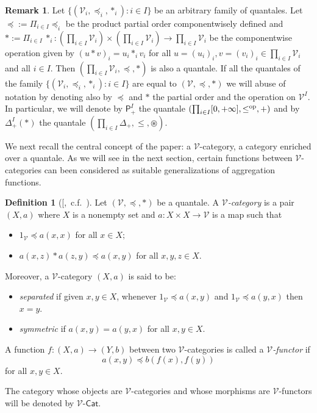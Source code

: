 \documentclass[11pt,a4paper]{amsart}
\theoremstyle{definition}
\newtheorem{definition}[theorem]{Definition}
\newtheorem{remark}[theorem]{Remark}
\begin{document}
	
	\begin{remark}\label{rem:product_quantales}
		Let $\Big\{(\mathscr{V}_i,\preceq_i,\ast_i):i\in I\Big\}$ be an arbitrary family of quantales. Let $\preceq:=\Pi_{i\in I}\preceq_i$ be the product partial order componentwisely defined and $\ast:=\Pi_{i\in I}~\ast_i :(\prod_{i\in I}\mathscr{V}_i)\times(\prod_{i\in I}\mathscr{V}_i)\to \prod_{i\in I}\mathscr{V}_i$ be the componentwise operation given by $(u\ast v)_i=u_i\ast_i v_i$ for all $u=(u_i)_i, v=(v_i)_i\in \prod_{i\in I}\mathscr{V}_i$ and all $i\in I.$ Then $(\prod_{i\in I}\mathscr{V}_i,\preceq,\ast)$ is also a quantale. If all the quantales of the family $\Big\{(\mathscr{V}_i,\preceq_i,\ast_i):i\in I\Big\}$ are equal to $(\mathscr{V},\preceq,\ast)$ we will abuse of notation by denoting also by $\preceq$ and $\ast$ the partial order and the operation on $\mathscr{V}^I.$ In particular, we will denote by $\mathsf{P}_+^I$ the quantale $(\prod_{i\in I} [0,+\infty],\leq^\text{\normalfont op},+)$ and by $\Delta^I_+(\ast)$ the quantale $(\prod_{i\in I} \Delta_+,\leq,\circledast).$
	\end{remark}
	
	
	
	
	
	We next recall the central concept of the paper: a $\mathscr{V}$-category, a category enriched over a quantale. As we will see in the next section, certain functions between $\mathscr{V}$-categories can been considered as suitable generalizations of aggregation functions.
	
	\begin{definition}[[\mbox{\cite[Section III.1.3]{BookMonoidalTopology}, c.f. \cite[Definition 3.1]{FlaggKopp97}}]
		Let $(\mathscr{V},\preceq,\ast)$ be a quantale. A \emph{$\mathscr{V}$-category} is a pair $(X,a)$ where $X$ is a nonempty set and $a:X\times X\to\mathscr{V}$ is a map such that
		\begin{itemize}
			\item[(VC1)] $1_\mathscr{V}\preceq a(x,x)$ for all $x\in X;$
			\item[(VC2)] $a(x,z)\ast a(z,y)\preceq a(x,y)$ for all $x,y,z\in X.$
		\end{itemize}
		Moreover, a $\mathscr{V}$-category $(X,a)$ is said to be:
		\begin{itemize}
			\item \emph{separated} if given $x,y \in X$, whenever $1_\mathscr{V}\preceq a(x,y)$ and $1_\mathscr{V}\preceq a(y,x)$ then $x=y.$
			\item \emph{symmetric} if $a(x,y)=a(y,x)$ for all $x,y\in X.$
		\end{itemize}
		
		A function $f:(X,a)\to (Y,b)$ between two $\mathscr{V}$-categories is called a \emph{$\mathscr{V}$-functor} if
		$$a(x,y)\preceq b(f(x),f(y))$$
		for all $x,y\in X.$
		
		The category whose objects are $\mathscr{V}$-categories and whose morphisms are $\mathscr{V}$-functors will be denoted by $\mathscr{V}$-$\mathsf{Cat}.$
		
	\end{definition}
	
\end{document}
